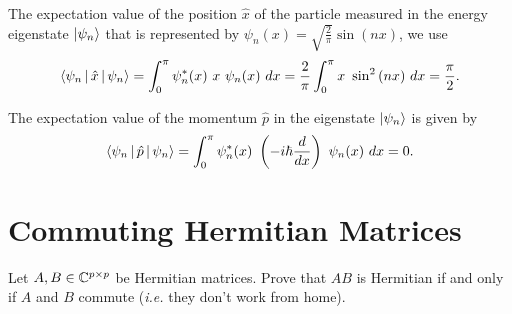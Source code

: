 \documentclass{article}
\numberwithin{equation}{section}
\begin{document}
The expectation value of the position $\hat{x}$ of the particle measured in the energy eigenstate $\ket{\psi_n}$ that is represented by $\psi_n(x) = \sqrt{\frac{2}{\pi}} \sin{(nx)}$, we use
\begin{equation}
    \Braket{\psi_n | \hat{x} | \psi_n} = \int_{0}^{\pi} \psi_n^*(x)\ x\ \psi_n(x)\ dx = \frac{2}{\pi} \int_{0}^{\pi} x\ \sin^2{(nx)}\ dx = \frac{\pi}{2}.
\end{equation}

The expectation value of the momentum $\hat{p}$ in the eigenstate $\ket{\psi_n}$ is given by
\begin{equation}
    \Braket{\psi_n | \hat{p} | \psi_n} = \int_{0}^{\pi} \psi_n^*(x)\ \left( -i\hbar\frac{d}{dx} \right)\ \psi_n(x)\ dx = 0.
\end{equation}

\section{Commuting Hermitian Matrices}

Let $A, B \in \mathbb{C}^{p \times p}$ be Hermitian matrices. Prove that $AB$ is Hermitian if and only if $A$ and $B$ commute (\textit{i.e.} they don't work from home).
\end{document}
